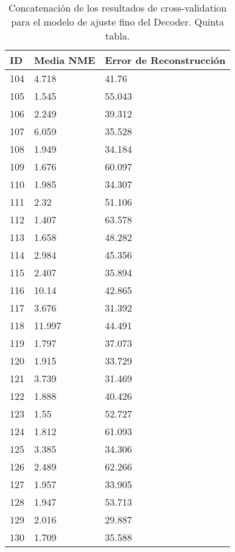 \begin{table}[!ht]
    \centering
    \caption{Concatenación de los resultados de cross-validation para el modelo de ajuste fino del Decoder. Quinta tabla.}
    \begin{tabular}{|l|l|l|}
    \hline
    \cellcolor{gray!25}\textbf{ID} & \cellcolor{gray!25}\textbf{Media NME} & \cellcolor{gray!25}\textbf{Error de Reconstrucción} \\ \hline
        104 & 4.718 & 41.76 \\ \hline
        105 & 1.545 & 55.043 \\ \hline
        106 & 2.249 & 39.312 \\ \hline
        107 & 6.059 & 35.528 \\ \hline
        108 & 1.949 & 34.184 \\ \hline
        109 & 1.676 & 60.097 \\ \hline
        110 & 1.985 & 34.307 \\ \hline
        111 & 2.32 & 51.106 \\ \hline
        112 & 1.407 & 63.578 \\ \hline
        113 & 1.658 & 48.282 \\ \hline
        114 & 2.984 & 45.356 \\ \hline
        115 & 2.407 & 35.894 \\ \hline
        116 & 10.14 & 42.865 \\ \hline
        117 & 3.676 & 31.392 \\ \hline
        118 & 11.997 & 44.491 \\ \hline
        119 & 1.797 & 37.073 \\ \hline
        120 & 1.915 & 33.729 \\ \hline
        121 & 3.739 & 31.469 \\ \hline
        122 & 1.888 & 40.426 \\ \hline
        123 & 1.55 & 52.727 \\ \hline
        124 & 1.812 & 61.093 \\ \hline
        125 & 3.385 & 34.306 \\ \hline
        126 & 2.489 & 62.266 \\ \hline
        127 & 1.957 & 33.905 \\ \hline
        128 & 1.947 & 53.713 \\ \hline
        129 & 2.016 & 29.887 \\ \hline
        130 & 1.709 & 35.588 \\ \hline
    \end{tabular}
\end{table}

\endinput

